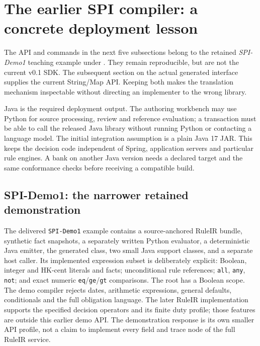 \section{The earlier SPI compiler: a concrete deployment lesson}

The API and commands in the next five subsections belong to the retained
\emph{SPI-Demo1} teaching example under . They remain
reproducible, but are not the current v0.1 SDK. The subsequent section on the actual
generated interface supplies the current String/Map API. Keeping both makes the
translation mechanism inspectable without directing an implementer to the wrong
library.


\label{merge:P-03d-java-delivery:00}

\label{sec:java}

Java is the required deployment output. The authoring workbench may use Python
for source processing, review and reference evaluation; a transaction must be
able to call the released Java library without running Python or contacting a
language model. The initial integration assumption is a plain Java 17 JAR.
This keeps the decision code independent of Spring, application servers and
particular rule engines. A bank on another Java version needs a declared target
and the same conformance checks before receiving a compatible build.

\subsection{SPI-Demo1: the narrower retained demonstration}
\label{merge:P-03d-java-delivery:01}


The delivered \texttt{SPI-Demo1} example contains a source-anchored RuleIR bundle,
synthetic fact snapshots, a separately written Python evaluator, a deterministic
Java emitter, the generated class, two small Java support classes, and a separate
host caller. Its implemented expression subset is deliberately explicit:
Boolean, integer and HK-cent literals and facts; unconditional rule references;
\texttt{all}, \texttt{any}, \texttt{not}; and exact numeric
\texttt{eq}/\texttt{ge}/\texttt{gt} comparisons. The root has a Boolean scope.
The demo compiler rejects dates, arithmetic expressions, general defaults,
conditionals and the full obligation language. The later RuleIR implementation
supports the specified decision operators and its finite duty profile; those
features are outside this earlier demo API. The demonstration response is its own smaller API profile,
not a claim to implement every field and trace node of the full RuleIR service.

